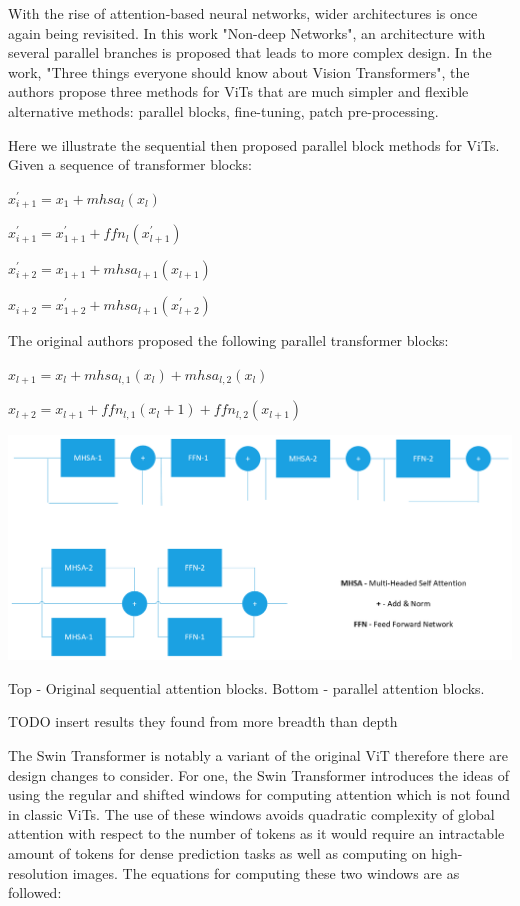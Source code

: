 \documentclass[10pt,twocolumn,letterpaper]{article}
\begin{document}
With the rise of attention-based neural networks, wider architectures is once again being revisited\cite{goyal2021non}. In this work "Non-deep Networks", an architecture with several parallel branches is proposed that leads to more complex design. In the work, "Three things everyone should know about Vision Transformers", the authors propose three methods for ViTs that are much simpler and flexible alternative methods: parallel blocks, fine-tuning, patch pre-processing\cite{touvron2022three}. 

Here we illustrate the sequential then proposed parallel block methods for ViTs. Given a sequence of transformer blocks:

$x^{'}_{i+1} = x_1 + mhsa_l(x_l)$

$x^{'}_{i+1} = x^{'}_{1+1} + ffn_l(x^{'}_{l+1})$

$x^{'}_{i+2} = x_{1+1} + mhsa_{l+1}(x_{l+1})$

$x_{i+2} = x^{'}_{1+2} + mhsa_{l+1}(x^{'}_{l+2})$

The original authors proposed the following parallel transformer blocks:

$x_{l+1} = x_{l} + mhsa_{l,1}(x_l) + mhsa_{l,2}(x_l)$

$x_{l+2} = x_{l+1} + ffn_{l,1}(x_l+1) + ffn_{l,2}(x_{l+1})$

\includegraphics[width=0.8\linewidth]{docs/latex/images/MHSA-Original.png}
\caption{Top - Original sequential attention blocks. Bottom - parallel attention blocks.}

TODO insert results they found from more breadth than depth

The Swin Transformer is notably a variant of the original ViT therefore there are design changes to consider. For one, the Swin Transformer introduces the ideas of using the regular and shifted windows for computing attention which is not found in classic ViTs. The use of these windows avoids quadratic complexity of global attention with respect to the number of tokens as it would require an intractable amount of tokens for dense prediction tasks as well as computing on high-resolution images. The equations for computing these two windows are as followed:
\end{document}
